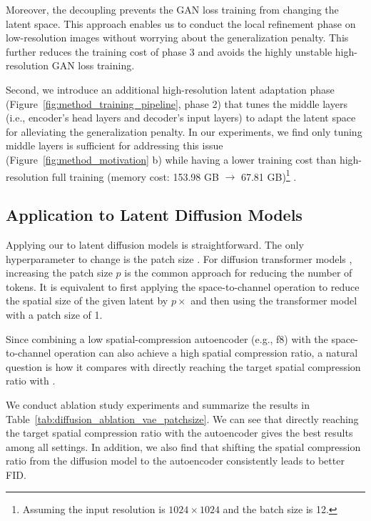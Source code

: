 Moreover, the decoupling prevents the GAN loss training from changing the latent space. This approach enables us to conduct the local refinement phase on low-resolution images without worrying about the generalization penalty. This further reduces the training cost of phase 3 and avoids the highly unstable high-resolution GAN loss training. 

Second, we introduce an additional high-resolution latent adaptation phase (Figure~\ref{fig:method_training_pipeline}, phase 2) that tunes the middle layers (i.e., encoder's head layers and decoder's input layers) to adapt the latent space for alleviating the generalization penalty. In our experiments, we find only tuning middle layers is sufficient for addressing this issue (Figure~\ref{fig:method_motivation} b) while having a lower training cost than high-resolution full training (memory cost: 153.98 GB $\rightarrow$ 67.81 GB)\footnote{Assuming the input resolution is $1024 \times 1024$ and the batch size is 12.} \citep{cai2020tinytl}. 



\subsection{Application to Latent Diffusion Models}
Applying our \modelshort to latent diffusion models is straightforward. The only hyperparameter to change is the patch size \citep{peebles2023scalable}. For diffusion transformer models \citep{peebles2023scalable,bao2023all}, increasing the patch size $p$ is the common approach for reducing the number of tokens. It is equivalent to first applying the space-to-channel operation to reduce the spatial size of the given latent by $p \times$ and then using the transformer model with a patch size of 1. 

Since combining a low spatial-compression autoencoder (e.g., f8) with the space-to-channel operation can also achieve a high spatial compression ratio, a natural question is how it compares with directly reaching the target spatial compression ratio with \modelshort. 

We conduct ablation study experiments and summarize the results in Table~\ref{tab:diffusion_ablation_vae_patchsize}. We can see that directly reaching the target spatial compression ratio with the autoencoder gives the best results among all settings. In addition, we also find that shifting the spatial compression ratio from the diffusion model to the autoencoder consistently leads to better FID. 
